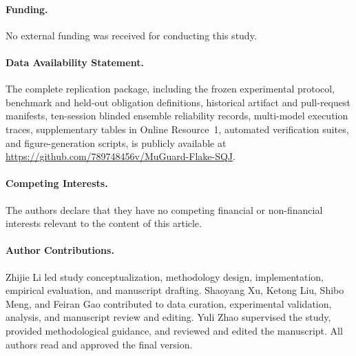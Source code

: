 \paragraph{Funding.}
No external funding was received for conducting this study.

\paragraph{Data Availability Statement.}
The complete replication package, including the frozen experimental protocol, benchmark and held-out obligation definitions, historical artifact and pull-request manifests, ten-session blinded ensemble reliability records, multi-model execution traces, supplementary tables in Online Resource~1, automated verification suites, and figure-generation scripts, is publicly available at \url{https://github.com/789748456v/MuGuard-Flake-SQJ}.

\paragraph{Competing Interests.}
The authors declare that they have no competing financial or non-financial interests relevant to the content of this article.

\paragraph{Author Contributions.}
Zhijie Li led study conceptualization, methodology design, implementation, empirical evaluation, and manuscript drafting. Shaoyang Xu, Ketong Liu, Shibo Meng, and Feiran Gao contributed to data curation, experimental validation, analysis, and manuscript review and editing. Yuli Zhao supervised the study, provided methodological guidance, and reviewed and edited the manuscript. All authors read and approved the final version.
